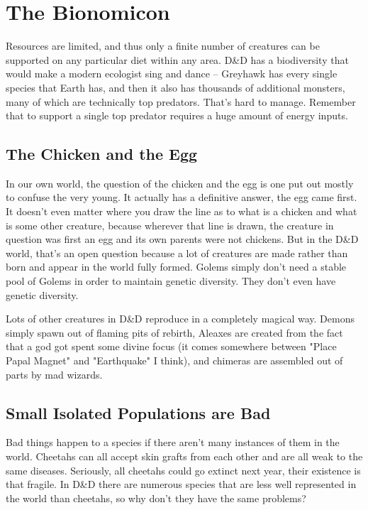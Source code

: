 \section{The Bionomicon} %
\vspace*{-10pt}

Resources are limited, and thus only a finite number of creatures can be supported on any particular diet within any area. D\&D has a biodiversity that would make a modern ecologist sing and dance -- Greyhawk has every single species that Earth has, and then it also has thousands of additional monsters, many of which are technically top predators. That's hard to manage. Remember that to support a single top predator requires a huge amount of energy inputs.

\subsection{The Chicken and the Egg}

In our own world, the question of the chicken and the egg is one put out mostly to confuse the very young. It actually has a definitive answer, the egg came first. It doesn't even matter where you draw the line as to what is a chicken and what is some other creature, because wherever that line is drawn, the creature in question was first an egg and its own parents were not chickens. But in the D\&D world, that's an open question because a lot of creatures are made rather than born and appear in the world fully formed. Golems simply don't need a stable pool of Golems in order to maintain genetic diversity. They don't even have genetic diversity.

Lots of other creatures in D\&D reproduce in a completely magical way. Demons simply spawn out of flaming pits of rebirth, Aleaxes are created from the fact that a god got spent some divine focus (it comes somewhere between "Place Papal Magnet" and "Earthquake" I think), and chimeras are assembled out of parts by mad wizards.

\subsection{Small Isolated Populations are Bad}

Bad things happen to a species if there aren't many instances of them in the world. Cheetahs can all accept skin grafts from each other and are all weak to the same diseases. Seriously, all cheetahs could go extinct next year, their existence is that fragile. In D\&D there are numerous species that are less well represented in the world than cheetahs, so why don't they have the same problems?

